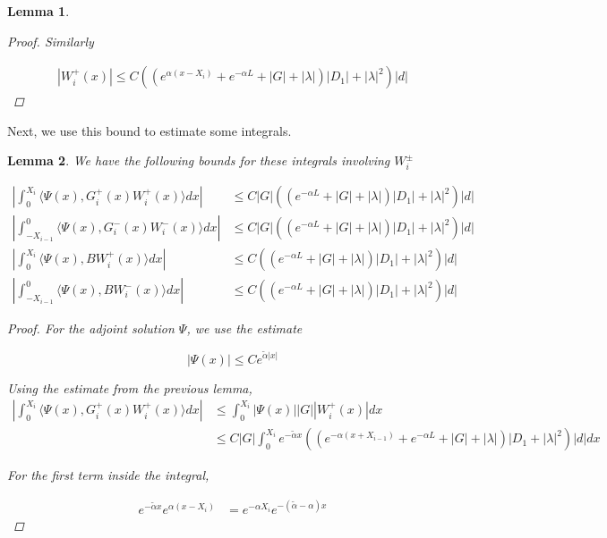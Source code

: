 \documentclass[12pt]{article}
\newtheorem{lemma}{Lemma}
\begin{document}
\begin{lemma}
\begin{proof}
Similarly

\begin{align*}
| W_i^+(x)| \leq C ( (e^{\alpha(x - X_{i})} + e^{-\alpha L} + |G| + |\lambda|)|D_1| + |\lambda|^2 )|d|
\end{align*}

\end{proof}

\end{lemma}


Next, we use this bound to estimate some integrals.

\begin{lemma}\label{intG}
We have the following bounds for these integrals involving $W_i^\pm$

\begin{align*}
\left| \int_0^{X_i} \langle \Psi(x), G_i^+(x) W_i^+(x) \rangle dx \right| &\leq C|G| \left( \left(e^{-\alpha L} + |G| + |\lambda|  \right) |D_1| + |\lambda|^2 \right)|d|\\
\left| \int_{-X_{i-1}}^0 \langle \Psi(x), G_i^-(x) W_i^-(x) \rangle dx \right| &\leq C|G| \left( \left(e^{-\alpha L} + |G| + |\lambda|  \right) |D_1| + |\lambda|^2 \right)|d|\\
\left| \int_0^{X_i} \langle \Psi(x), B W_i^+(x) \rangle dx \right| &\leq C \left( \left(e^{-\alpha L} + |G| + |\lambda|  \right) |D_1| + |\lambda|^2 \right)|d|\\
\left| \int_{-X_{i-1}}^0 \langle \Psi(x), B W_i^-(x) \rangle dx \right| &\leq C \left( \left(e^{-\alpha L} + |G| + |\lambda|  \right) |D_1| + |\lambda|^2 \right)|d|
\end{align*}

\begin{proof}

For the adjoint solution $\Psi$, we use the estimate

\[
|\Psi(x)| \leq C e^{\tilde{\alpha}|x|}
\]

Using the estimate from the previous lemma,
\begin{align*}
\left| \int_0^{X_i} \langle \Psi(x), G_i^+(x) W_i^+(x) \rangle dx \right| &\leq \int_0^{X_i} |\Psi(x)||G| |W_i^+(x)| dx \\
&\leq C|G| \int_0^{X_i} e^{-\tilde{\alpha} x} \left( (e^{-\alpha(x + X_{i-1})} + e^{-\alpha L} + |G| + |\lambda|)|D_1 + |\lambda|^2 \right) |d| dx 
\end{align*}

For the first term inside the integral,

\begin{align*}
e^{-\tilde{\alpha} x} e^{\alpha(x - X_{i})} &= e^{-\alpha X_i} e^{-(\tilde{\alpha} - \alpha)x}
\end{align*}


\end{proof}
\end{lemma}
\end{document}

